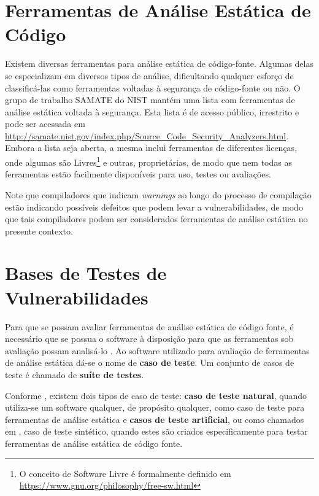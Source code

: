   \section{Ferramentas de Análise Estática de Código}

  Existem diversas ferramentas para análise estática de código-fonte. Algumas delas se especializam em diversos tipos de análise, dificultando qualquer esforço de classificá-las como ferramentas voltadas à segurança de código-fonte ou não. O grupo de trabalho SAMATE do  NIST mantém uma lista com ferramentas de análise estática voltada à segurança. Esta lista é de acesso público, irrestrito e pode ser acessada em \url{http://samate.nist.gov/index.php/Source_Code_Security_Analyzers.html}. Embora a lista seja aberta, a mesma inclui ferramentas de diferentes licenças, onde algumas são Livres\footnote{O conceito de Software Livre é formalmente definido em \url{https://www.gnu.org/philosophy/free-sw.html}} e outras, proprietárias, de modo que nem todas as ferramentas estão facilmente disponíveis para uso, testes ou avaliações.

  Note que compiladores que indicam \textit{warnings} ao longo do processo de compilação estão indicando possíveis defeitos que podem levar a vulnerabilidades, de modo que tais compiladores podem ser considerados ferramentas de análise estática no presente contexto.


  \section{Bases de Testes de Vulnerabilidades}\label{fundamentacao_teorica:bases_de_testes_de_vulnerabilidades}

  Para que se possam avaliar ferramentas de análise estática de código fonte, é necessário que se possua o software à disposição para que as ferramentas sob avaliação possam analisá-lo \cite{nsa}. Ao software utilizado para avaliação de ferramentas de análise estática dá-se o nome de \textbf{caso de teste}. Um conjunto de casos de teste é chamado de \textbf{suíte de testes}.

  Conforme \cite{nsa}, existem dois tipos de caso de teste: \textbf{caso de teste natural}, quando utiliza-se um software qualquer, de propósito qualquer, como caso de teste para ferramentas de análise estática e \textbf{casos de teste artificial}, ou como chamados em \cite {juliet}, caso de teste sintético, quando estes são criados especificamente para testar ferramentas de análise estática de código fonte.

